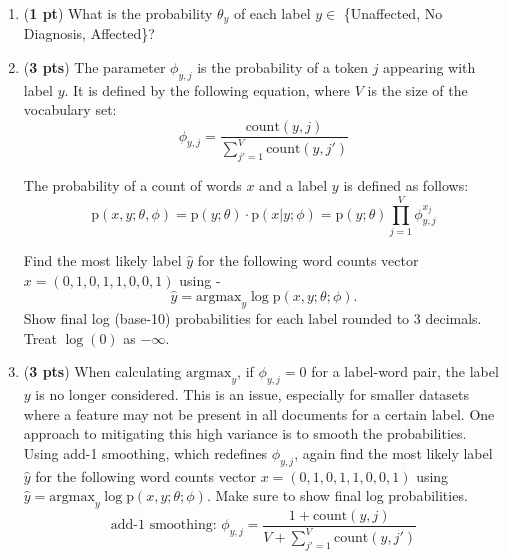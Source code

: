 \documentclass[11pt, letterpaper]{article}
\begin{document}
    \begin{enumerate}[label=(\alph*)]
        \item (\textbf{1 pt}) What is the probability $\theta_y$ of each label $y \in$ \{Unaffected, No Diagnosis, Affected\}?\\
        
        \item (\textbf{3 pts}) The parameter $\phi_{y, j}$ is the probability of a token $j$ appearing with label $y$. It is defined by the following equation, where $V$ is the size of the vocabulary set:
        $$ \phi_{y, j} = \frac{\text{count}(y, j)}{\sum^V_{j'=1}\text{count}(y, j')}$$
        
        The probability of a count of words $x$ and a label $y$ is defined as follows:
        $$ \mathrm{p}(x, y; \theta, \phi) = \mathrm{p}(y; \theta) \cdot \mathrm{p}(x|y; \phi) = \mathrm{p}(y; \theta)\prod^V_{j=1} \phi^{x_j}_{y, j} $$
        
        Find the most likely label $\hat y$ for the following word counts vector $x = (0,1,0,1,1,0,0,1)$ using -
        $$\hat y = \text{argmax}_y \log \mathrm{p}(x, y; \theta; \phi).$$
        Show final log (base-10) probabilities for each label rounded to 3 decimals. Treat $\log(0)$ as $-\infty$.
        
        \item (\textbf{3 pts}) When calculating $\text{argmax}_y$, if $\phi_{y, j} = 0$ for a label-word pair, the label $y$  is no longer considered. This is an issue, especially for smaller datasets where a feature may not be present in all documents for a certain label. One approach to mitigating this high variance is to smooth the probabilities. Using add-1 smoothing, which redefines $\phi_{y, j}$, again find the most likely label $\hat y$ for the following word counts vector $x = (0,1,0,1,1,0,0,1)$ using $\hat y = \text{argmax}_y \log \mathrm{p}(x, y; \theta; \phi)$. Make sure to show final log probabilities.\\
        $$\text{add-1 smoothing: } \phi_{y, j} = \frac{1 + \text{count}(y, j)}{V + \sum^V_{j'=1}\text{count}(y, j')}$$\\
    \end{enumerate}
    
\newpage
\end{document}
